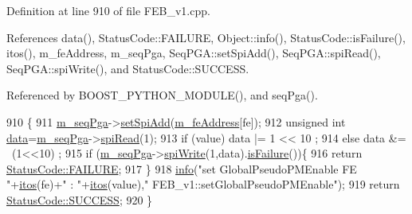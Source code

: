 Definition at line 910 of file F\+E\+B\+\_\+v1.\+cpp.



References data(), Status\+Code\+::\+F\+A\+I\+L\+U\+RE, Object\+::info(), Status\+Code\+::is\+Failure(), itos(), m\+\_\+fe\+Address, m\+\_\+seq\+Pga, Seq\+P\+G\+A\+::set\+Spi\+Add(), Seq\+P\+G\+A\+::spi\+Read(), Seq\+P\+G\+A\+::spi\+Write(), and Status\+Code\+::\+S\+U\+C\+C\+E\+SS.



Referenced by B\+O\+O\+S\+T\+\_\+\+P\+Y\+T\+H\+O\+N\+\_\+\+M\+O\+D\+U\+L\+E(), and seq\+Pga().


\begin{DoxyCode}
910                                                               \{
911   \hyperlink{classFEB__v1_a6c7804ac86796f233a8393043adf2e77}{m\_seqPga}->\hyperlink{classSeqPGA_ac998ce3a6d9b5f2e88cc8393f8c1df53}{setSpiAdd}(\hyperlink{classFEB__v1_a4e1945c2d5b434125f375e9d0fc6d99f}{m\_feAddress}[fe]);
912   \textcolor{keywordtype}{unsigned} \textcolor{keywordtype}{int} \hyperlink{classFEB__v1_a6bca4320bd3bbbc32efc81097f33421a}{data}=\hyperlink{classFEB__v1_a6c7804ac86796f233a8393043adf2e77}{m\_seqPga}->\hyperlink{classSeqPGA_ab3d0e5e5d4014bc7a92588a76b8713d4}{spiRead}(1);
913   \textcolor{keywordflow}{if} (value)  data |= 1 << 10 ;
914   \textcolor{keywordflow}{else}        data &= ~(1<<10) ;
915   \textcolor{keywordflow}{if} (\hyperlink{classFEB__v1_a6c7804ac86796f233a8393043adf2e77}{m\_seqPga}->\hyperlink{classSeqPGA_ad4421841ce4ce8b88ad13f63216f0743}{spiWrite}(1,data).\hyperlink{classStatusCode_a5dd22dc6eb2c52fc4cabc58f6dea2eb7}{isFailure}())\{
916     \textcolor{keywordflow}{return} \hyperlink{classStatusCode_a6f565cbeadc76d14c72f047e5e85eb4ba3da73d4c469762eb9d3c960368252b26}{StatusCode::FAILURE};
917   \}
918   \hyperlink{classObject_a644fd329ea4cb85f54fa6846484b84a8}{info}(\textcolor{stringliteral}{"set GlobalPseudoPMEnable FE "}+\hyperlink{Tools_8h_af330027dbdafb9a30768b3613c553e60}{itos}(fe)+\textcolor{stringliteral}{" : "}+\hyperlink{Tools_8h_af330027dbdafb9a30768b3613c553e60}{itos}(value),\textcolor{stringliteral}{"
      FEB\_v1::setGlobalPseudoPMEnable"});
919   \textcolor{keywordflow}{return} \hyperlink{classStatusCode_a6f565cbeadc76d14c72f047e5e85eb4badd0da38d3ba0d922efd1f4619bc37ad8}{StatusCode::SUCCESS};
920 \}
\end{DoxyCode}
\mbox{\label{classObject_a398fe08cba594a0ce6891d59fe4f159f}} 
